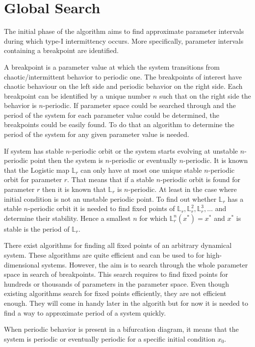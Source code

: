 \section{Global Search}
The initial phase of the algorithm aims to find approximate parameter intervals during which type-I intermittency occurs.
More specifically, parameter intervals containing a breakpoint are identified.
\par
A breakpoint is a parameter value at which the system transitions from chaotic/intermittent behavior to periodic one.
The breakpoints of interest have chaotic behaviour on the left side and periodic behavior on the right side.
Each breakpoint can be identified by a unique number $n$ such that on the right side the behavior is $n$-periodic.
If parameter space could be searched through and the period of the system for each parameter value could be determined, the breakpoints could be easily found.
To do that an algorithm to determine the period of the system for any given parameter value is needed.
\par
If system has stable $n$-periodic orbit or the system starts evolving at unstable $n$-periodic point then the system is $n$-periodic or eventually $n$-periodic.
It is known that the Logistic map $\mathbb{L}_r$ can only have at most one unique stable $n$-periodic orbit for parameter $r$.
That means that if a stable $n$-periodic orbit is found for parameter $r$ then it is known that $\mathbb{L}_r$ is $n$-periodic.
At least in the case where initial condition is not an unstable periodic point.
To find out whether $\mathbb{L}_r$ has a stable $n$-periodic orbit it is needed to find fixed points of $\mathbb{L}_r, \mathbb{L}_{r}^{2}, \mathbb{L}_{r}^{3}, \dots$ and determine their stability.
Hence a smallest $n$ for which $\mathbb{L}_{r}^{n}(x^{*})=x^{*}$ and $x^{*}$ is stable is the period of $\mathbb{L}_r$.
\par
There exist algorithms for finding all fixed points of an arbitrary dynamical system.
These algorithms are quite efficient and can be used to for high-dimensional systems.
However, the aim is to search through the whole parameter space in search of breakpoints.
This search requires to find fixed points for hundreds or thousands of parameters in the parameter space.
Even though existing algorithms search for fixed points efficiently, they are not efficient enough.
They will come in handy later in the algorith but for now it is needed to find a way to approximate period of a system quickly.
\par
When periodic behavior is present in a bifurcation diagram, it means that the system is periodic or eventually periodic for a specific initial condition $x_0$.
